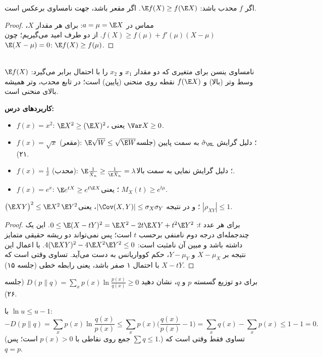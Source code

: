 \begin{theorem}
اگر $f$ محدب باشد: $\E f(X)\ge f(\E X)$. اگر مقعر باشد، جهت نامساوی برعکس است.
\end{theorem}
\begin{proof}
مماس در $a=\mu=\E X$: برای هر مقدار $X$، $f(X)\ge f(\mu)+f'(\mu)(X-\mu)$. از دو طرف امید می‌گیریم؛ چون $\E(X-\mu)=0$: $\E f(X)\ge f(\mu)$.
\end{proof}

\begin{center}
\begin{tikzpicture}
\end{tikzpicture}\\
{\small نامساوی ینسن برای متغیری که دو مقدار $x_1$ و $x_2$ را با احتمال برابر می‌گیرد: $\E f(X)$ وسط وتر (بالا) و $f(\E X)$ نقطه روی منحنی (پایین) است؛ در تابع محدب، وتر همیشه بالای منحنی است.}
\end{center}

\textbf{کاربردهای درس:}
\begin{itemize}
\item $f(x)=x^2$: $\E X^2\ge(\E X)^2$، یعنی $\Var X\ge0$.
\item $f(x)=\sqrt x$ (مقعر): $\E\sqrt W\le\sqrt{\E W}$؛ دلیل گرایش $\hat\sigma_\ML$ به سمت پایین (جلسه ۲۱).
\item $f(x)=\frac1x$ (محدب): $\E\frac{1}{\bar X_n}\ge\frac{1}{\E\bar X_n}=\lambda$؛ دلیل گرایش  نمایی به سمت بالا.
\item $f(x)=e^{x}$: $\E e^{tX}\ge e^{t\E X}$؛ یعنی $M_X(t)\ge e^{t\mu}$.
\end{itemize}

\begin{theorem}
$\big(\E XY\big)^2\le\E X^2\,\E Y^2$؛ و در نتیجه $|\Cov(X,Y)|\le\sigma_X\sigma_Y$، یعنی $|\rho_{XY}|\le1$.
\end{theorem}
\begin{proof}
برای هر عدد $t$: $0\le\E(X-tY)^2=\E X^2-2t\E XY+t^2\E Y^2$. این یک چندجمله‌ای درجه دوم نامنفی برحسب $t$ است؛ پس نمی‌تواند دو ریشه حقیقی متمایز داشته باشد و مبین آن نامثبت است: $4(\E XY)^2-4\E X^2\E Y^2\le0$. با اعمال این نتیجه بر $X-\mu_X$ و $Y-\mu_Y$، حکم کوواریانس به دست می‌آید. تساوی وقتی است که $X-tY$ با احتمال ۱ صفر باشد، یعنی رابطه خطی (جلسه ۱۵).
\end{proof}

\begin{example}
برای دو توزیع گسسته $p$ و $q$، نشان دهید $D(p\|q)=\sum_xp(x)\ln\frac{p(x)}{q(x)}\ge0$ (جلسه ۲۶).
\begin{solution}
با $\ln u\le u-1$:
\[
-D(p\|q)=\sum_xp(x)\ln\frac{q(x)}{p(x)}\le\sum_xp(x)\Big(\frac{q(x)}{p(x)}-1\Big)=\sum_xq(x)-\sum_xp(x)\le1-1=0 .
\]
(جمع روی نقاطی با $p(x)>0$ است؛ پس $\sum q\le1$.) تساوی فقط وقتی است که $q=p$.
\end{solution}
\end{example}

